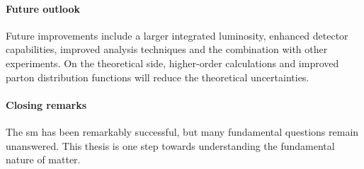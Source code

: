 \documentclass[../../thesis.tex]{subfiles}
\begin{document}
\paragraph{Future outlook} Future improvements include a larger integrated luminosity, enhanced detector capabilities, improved analysis techniques and the combination with other experiments. On the theoretical side, higher-order calculations and improved parton distribution functions will reduce the theoretical uncertainties.

\paragraph{Closing remarks} The \gls{sm} has been remarkably successful, but many fundamental questions remain unanswered. This thesis is one step towards understanding the fundamental nature of matter.

\end{document}
